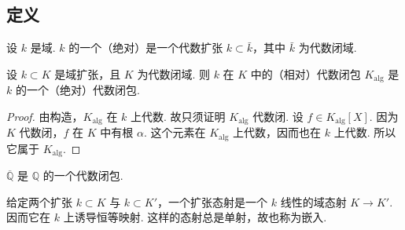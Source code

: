 \subsection{定义}\label{sec:galois-2-2-2}
\begin{definition*}
设 $k$ 是域. $k$ 的一个（绝对）是一个代数扩张 $k\subset\bar k$，其中 $\bar k$ 为代数闭域.
\end{definition*}
\begin{lemma*}
设 $k\subset K$ 是域扩张，且 $K$ 为代数闭域. 则 $k$ 在 $K$ 中的（相对）代数闭包 $K_{\mathrm{alg}}$ 是 $k$ 的一个（绝对）代数闭包.
\end{lemma*}
\begin{proof}
由构造，$K_{\mathrm{alg}}$ 在 $k$ 上代数. 故只须证明 $K_{\mathrm{alg}}$ 代数闭. 设 $f\in K_{\mathrm{alg}}[X]$. 因为 $K$ 代数闭，$f$ 在 $K$ 中有根 $\alpha$. 这个元素在 $K_{\mathrm{alg}}$ 上代数，因而也在 $k$ 上代数. 所以它属于 $K_{\mathrm{alg}}$.
\end{proof}
\begin{example*}
$\overline{\mathbb Q}$ 是 $\mathbb Q$ 的一个代数闭包.
\end{example*}
给定两个扩张 $k\subset K$ 与 $k\subset K'$，一个扩张态射是一个 $k$ 线性的域态射 $K\to K'$. 因而它在 $k$ 上诱导恒等映射. 这样的态射总是单射，故也称为嵌入.

